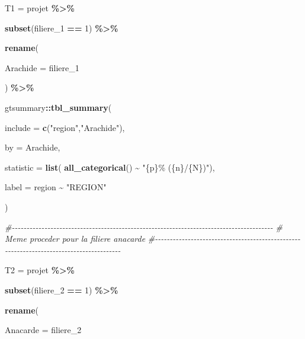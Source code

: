 \documentclass[
]{article}
\newenvironment{Shaded}{\begin{snugshade}}{\end{snugshade}}
\newcommand{\AttributeTok}[1]{\textcolor[rgb]{0.13,0.29,0.53}{#1}}
\newcommand{\CommentTok}[1]{\textcolor[rgb]{0.56,0.35,0.01}{\textit{#1}}}
\newcommand{\DecValTok}[1]{\textcolor[rgb]{0.00,0.00,0.81}{#1}}
\newcommand{\FunctionTok}[1]{\textcolor[rgb]{0.13,0.29,0.53}{\textbf{#1}}}
\newcommand{\NormalTok}[1]{#1}
\newcommand{\OtherTok}[1]{\textcolor[rgb]{0.56,0.35,0.01}{#1}}
\newcommand{\SpecialCharTok}[1]{\textcolor[rgb]{0.81,0.36,0.00}{\textbf{#1}}}
\newcommand{\StringTok}[1]{\textcolor[rgb]{0.31,0.60,0.02}{#1}}
\begin{document}
\begin{Shaded}
\begin{Highlighting}[]
\NormalTok{T1 }\OtherTok{=}\NormalTok{ projet }\SpecialCharTok{\%\textgreater{}\%}
  
  \FunctionTok{subset}\NormalTok{(filiere\_1 }\SpecialCharTok{==} \DecValTok{1}\NormalTok{) }\SpecialCharTok{\%\textgreater{}\%} 
  
  \FunctionTok{rename}\NormalTok{(}
    
    \AttributeTok{Arachide =}\NormalTok{ filiere\_1}
    
\NormalTok{  ) }\SpecialCharTok{\%\textgreater{}\%} 
  
\NormalTok{  gtsummary}\SpecialCharTok{::}\FunctionTok{tbl\_summary}\NormalTok{(}
    
  \AttributeTok{include =} \FunctionTok{c}\NormalTok{(}\StringTok{"region"}\NormalTok{,}\StringTok{"Arachide"}\NormalTok{),}
  
  \AttributeTok{by =}\NormalTok{ Arachide,}
  
  \AttributeTok{statistic =} \FunctionTok{list}\NormalTok{( }\FunctionTok{all\_categorical}\NormalTok{() }\SpecialCharTok{\textasciitilde{}} \StringTok{"\{p\}\% (\{n\}/\{N\})"}\NormalTok{),}
  
  \AttributeTok{label =}\NormalTok{ region }\SpecialCharTok{\textasciitilde{}} \StringTok{"REGION"}

\NormalTok{)}




\CommentTok{\#{-}{-}{-}{-}{-}{-}{-}{-}{-}{-}{-}{-}{-}{-}{-}{-}{-}{-}{-}{-}{-}{-}{-}{-}{-}{-}{-}{-}{-}{-}{-}{-}{-}{-}{-}{-}{-}{-}{-}{-}{-}{-}{-}{-}{-}{-}{-}{-}{-}{-}{-}{-}{-}{-}{-}{-}{-}{-}{-}{-}{-}{-}{-}{-}{-}{-}{-}{-}{-}{-}{-}{-}{-}{-}{-}{-}{-}{-}{-}{-}{-}{-}{-}{-}{-}{-}{-}{-}}
\CommentTok{\#     Meme proceder pour la filiere anacarde}
\CommentTok{\#{-}{-}{-}{-}{-}{-}{-}{-}{-}{-}{-}{-}{-}{-}{-}{-}{-}{-}{-}{-}{-}{-}{-}{-}{-}{-}{-}{-}{-}{-}{-}{-}{-}{-}{-}{-}{-}{-}{-}{-}{-}{-}{-}{-}{-}{-}{-}{-}{-}{-}{-}{-}{-}{-}{-}{-}{-}{-}{-}{-}{-}{-}{-}{-}{-}{-}{-}{-}{-}{-}{-}{-}{-}{-}{-}{-}{-}{-}{-}{-}{-}{-}{-}{-}{-}{-}{-}{-}}



\NormalTok{T2 }\OtherTok{=}\NormalTok{ projet }\SpecialCharTok{\%\textgreater{}\%}
  
  \FunctionTok{subset}\NormalTok{(filiere\_2 }\SpecialCharTok{==} \DecValTok{1}\NormalTok{) }\SpecialCharTok{\%\textgreater{}\%} 
  
  \FunctionTok{rename}\NormalTok{(}
    
    \AttributeTok{Anacarde =}\NormalTok{ filiere\_2}
    

\end{Highlighting}
\end{Shaded}
\end{document}
